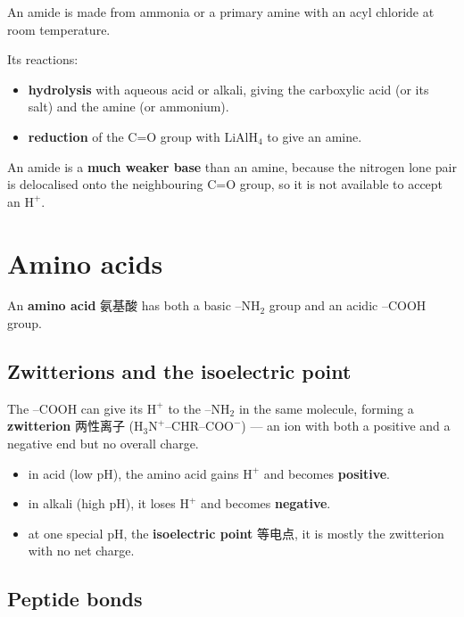 \documentclass[11pt]{article}
\begin{document}
An amide is made from ammonia or a primary amine with an acyl chloride at room temperature.

Its reactions:

\begin{itemize}
\item \textbf{hydrolysis} with aqueous acid or alkali, giving the carboxylic acid (or its salt) and the amine (or ammonium).

\item \textbf{reduction} of the C=O group with $\text{LiAlH}_4$ to give an amine.

\end{itemize}

An amide is a \textbf{much weaker base} than an amine, because the nitrogen lone pair is delocalised onto the neighbouring C=O group, so it is not available to accept an $\text{H}^+$.

\section*{Amino acids}

An \textbf{amino acid} 氨基酸 has both a basic $\text{–NH}_2$ group and an acidic $\text{–COOH}$ group.

\subsection*{Zwitterions and the isoelectric point}

The $\text{–COOH}$ can give its $\text{H}^+$ to the $\text{–NH}_2$ in the same molecule, forming a \textbf{zwitterion} 两性离子 ($\text{H}_3\text{N}^+\text{–CHR–COO}^-$) — an ion with both a positive and a negative end but no overall charge.

\begin{itemize}
\item in acid (low pH), the amino acid gains $\text{H}^+$ and becomes \textbf{positive}.

\item in alkali (high pH), it loses $\text{H}^+$ and becomes \textbf{negative}.

\item at one special pH, the \textbf{isoelectric point} 等电点, it is mostly the zwitterion with no net charge.

\end{itemize}

\subsection*{Peptide bonds}
\end{document}
